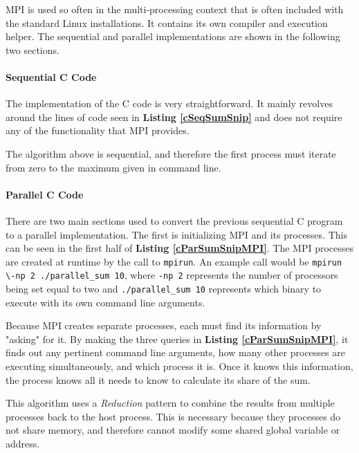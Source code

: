 \documentclass[12pt]{article}
\newcommand{\code}[1]{\lstinline[]{#1}}
\newcommand{\codeRef}[1]{\textbf{Listing \ref{#1}}}
\begin{document}
MPI is used so often in the multi-processing context that is often included with the standard Linux installations. It contains its own compiler and execution helper. The sequential and parallel implementations are shown in the following two sections.

\paragraph{Sequential C Code}

The implementation of the C code is very straightforward. It mainly revolves around the lines of code seen in \codeRef{cSeqSumSnip} and does not require any of the functionality that MPI provides.




The algorithm above is sequential, and therefore the first process must iterate from zero to the maximum given in command line.

\paragraph{Parallel C Code}

There are two main sections used to convert the previous sequential C program to a parallel implementation. The first is initializing MPI and its processes. This can be seen in the first half of \codeRef{cParSumSnipMPI}. The MPI processes are created at runtime by the call to \code{mpirun}.
An example call would be \code{mpirun \-np 2 ./parallel_sum 10},
where \code{-np 2} represents the number of processors being set equal to two and \code{./parallel_sum 10} represents which binary to execute with its own command line arguments.

Because MPI creates separate processes, each must find its information by "asking" for it. By making the three queries in \codeRef{cParSumSnipMPI}, it finds out any pertinent command line arguments, how many other processes are executing simultaneously, and which process it is. Once it knows this information, the process knows all it needs to know to calculate its share of the sum.

This algorithm uses a \textit{Reduction} pattern to combine the results from multiple processes back to the host process. This is necessary because they processes do not share memory, and therefore cannot modify some shared global variable or address.
\end{document}
